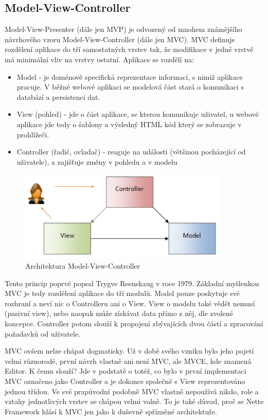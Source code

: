 \documentclass[11pt,twoside,a4paper]{book}
\begin{document}
\subsection{Model-View-Controller}
Model-View-Presenter (dále jen MVP) je odvozený od mnohem známějšího návrhového vzoru Model-View-Controller (dále jen MVC). MVC definuje rozdělení aplikace do tří samostatných vrstev tak, že modifikace v jedné vrstvě má minimální vliv na vrstvy ostatní. Aplikace se rozdělí na:
\begin{itemize}
\item Model - je doménově specifická reprezentace informací, s nimiž aplikace pracuje. V běžné webové aplikaci se modelová část stará o komunikaci s databází a persistenci dat.
\item View (pohled) - jde o část aplikace, se kterou komunikuje uživatel, u webové aplikace jde tedy o šablony a výsledný HTML kód který se zobrazuje v prohlížeči.
\item Controller (řadič, ovladač) - reaguje na události (většinou pocházející od uživatele), a zajišťuje změny v pohledu a v modelu
\end{itemize}
\begin{figure}[h]
\begin{center}
\includegraphics[width=10cm]{figures/mvc.png}
\caption{Architektura Model-View-Controller}
\label{fig:mvc}
\end{center}
\end{figure}
Tento princip poprvé popsal Trygve Reenskaug v roce 1979\cite{mvc-original}. Základní myšlenkou MVC je tedy rozdělení aplikace do tří modulů. Model pouze poskytuje své rozhraní a neví nic o Controlleru ani o View. View o modelu také vědět nemusí (pasivní view), nebo naopak může získávat data přímo z něj, dle zvolené koncepce. Controller potom slouží k propojení zbývajících dvou částí a zpracování požadavků od uživatele.

MVC ovšem nelze chápat dogmaticky. Už v době svého vzniku bylo jeho pojetí velmi různorodé, první návrh vlastně ani není MVC, ale MVCE, kde  znamená Editor. K čemu slouží? Jde v podstatě o totéž, co bylo v první implementaci MVC označeno jako Controller a je dokonce společně s View reprezentováno jednou třídou. Ve své prapůvodní podobně MVC vlastně nepoužívá nikdo, role a vztahy jednotlivých vrstev se chápou velmi volně. To je také důvod, proč se Nette Framework hlásí k MVC jen jako k duševně spřízněné architektuře.
\end{document}
